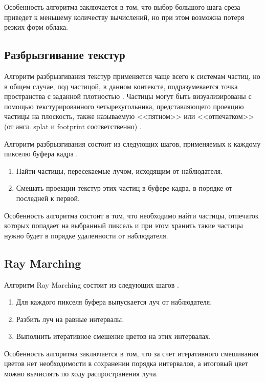 Особенность алгоритма заключается в том, что выбор большого шага среза приведет к меньшему количеству вычислений, но при этом возможна потеря резких форм облака.


\subsection{Разбрызгивание текстур}
\label{splatting}
Алгоритм разбрызгивания текстур применяется чаще всего к системам частиц, но в общем случае, под частицой, в данном контексте, подразумевается точка пространства с заданной плотностью \cite{clouds}.
Частицы могут быть визуализированы с помощью текстурированного четырехугольника, представляющего проекцию частицы на плоскость, также называемую <<пятном>> или <<отпечатком>> (от англ. splat и footprint соответственно) \cite{clouds, voxel}. 

Алгоритм разбрызгивания состоит из следующих шагов, применяемых к каждому пикселю буфера кадра \cite{voxel, clouds}.
\begin{enumerate}
	\item Найти частицы, пересекаемые лучом, исходящим от наблюдателя.
	\item Смешать проекции текстур этих частиц в буфере кадра, в порядке от последней к первой.
\end{enumerate} 

Особенность алгоритма состоит в том, что необходимо найти частицы, отпечаток которых попадает на выбранный пиксель и при этом хранить такие частицы нужно будет в порядке удаленности от наблюдателя.

\subsection{Ray Marching}
\label{ray}

Алгоритм Ray Marching состоит из следующих шагов \cite{hzd, frostbite, clouds}.
\begin{enumerate}
	\item Для каждого пикселя буфера выпускается луч от наблюдателя.
	\item Разбить луч на равные интервалы.
	\item Выполнить итеративное смешение цветов на этих интервалах.
\end{enumerate}

Особенность алгоритма заключается в том, что за счет итеративного смешивания цветов нет необходимости в сохранении порядка интервалов, а итоговый цвет можно вычислять по ходу распространения луча.

